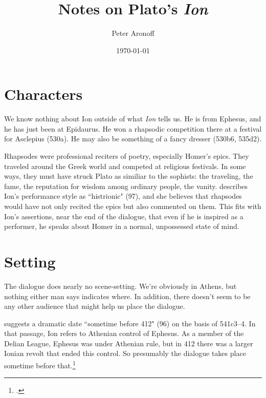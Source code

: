 \documentclass[11pt,letterpaper]{article}
\title{Notes on Plato's \textit{Ion}}
\author{Peter Aronoff}
\date{\today}
\begin{document}
\maketitle


\section{Characters}

We know nothing about Ion outside of what \textit{Ion} tells us.  He is from
Ephesus, and he has just been at Epidaurus.  He won a rhapsodic competition
there at a festival for Asclepius (530a).  He may also be something of
a fancy dresser (530b6, 535d2).

Rhapsodes were professional reciters of poetry, especially Homer's epics.
They traveled around the Greek world and competed at religious festivals.
In some ways, they must have struck Plato as similiar to the sophists: the
traveling, the fame, the reputation for wisdom among ordinary people, the
vanity.  \textcite{murray1996} describes Ion's performance style as
``histrionic" (97), and she believes that rhapsodes would have not only
recited the epics but also commented on them.  This fits with Ion's
assertions, near the end of the dialogue, that even if he is inspired as
a performer, he speaks about Homer in a normal, unpossessed state of mind.


\section{Setting}

The dialogue does nearly no scene-setting.  We're obviously in Athens, but nothing either man says indicates where.  In addition, there doesn't seem to be any other audience that might help us place the dialogue.

\textcite{murray1996} suggests a dramatic date ``sometime before 412" (96) on the basis of 541c3--4.  In that passage, Ion refers to Athenian control of Ephesus.  As a member of the Delian League, Ephesus was under Athenian rule, but in 412 there was a larger Ionian revolt that ended this control.  So presumably the dialogue takes place sometime before that.\footcites[See][]{moore1974}[and also][28--31, 163--4]{canto2001}


\end{document}
